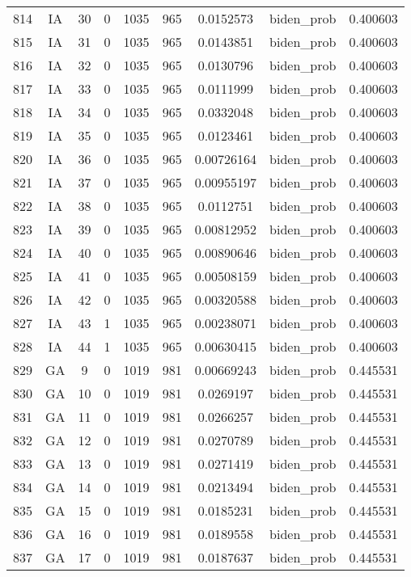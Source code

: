 \documentclass[12pt,a4paper]{article}
\begin{document}
\begin{tabular}{r|cccccccc}
	814 & IA & 30 & 0 & 1035 & 965 & 0.0152573 & biden\_prob & 0.400603 \\
	815 & IA & 31 & 0 & 1035 & 965 & 0.0143851 & biden\_prob & 0.400603 \\
	816 & IA & 32 & 0 & 1035 & 965 & 0.0130796 & biden\_prob & 0.400603 \\
	817 & IA & 33 & 0 & 1035 & 965 & 0.0111999 & biden\_prob & 0.400603 \\
	818 & IA & 34 & 0 & 1035 & 965 & 0.0332048 & biden\_prob & 0.400603 \\
	819 & IA & 35 & 0 & 1035 & 965 & 0.0123461 & biden\_prob & 0.400603 \\
	820 & IA & 36 & 0 & 1035 & 965 & 0.00726164 & biden\_prob & 0.400603 \\
	821 & IA & 37 & 0 & 1035 & 965 & 0.00955197 & biden\_prob & 0.400603 \\
	822 & IA & 38 & 0 & 1035 & 965 & 0.0112751 & biden\_prob & 0.400603 \\
	823 & IA & 39 & 0 & 1035 & 965 & 0.00812952 & biden\_prob & 0.400603 \\
	824 & IA & 40 & 0 & 1035 & 965 & 0.00890646 & biden\_prob & 0.400603 \\
	825 & IA & 41 & 0 & 1035 & 965 & 0.00508159 & biden\_prob & 0.400603 \\
	826 & IA & 42 & 0 & 1035 & 965 & 0.00320588 & biden\_prob & 0.400603 \\
	827 & IA & 43 & 1 & 1035 & 965 & 0.00238071 & biden\_prob & 0.400603 \\
	828 & IA & 44 & 1 & 1035 & 965 & 0.00630415 & biden\_prob & 0.400603 \\
	829 & GA & 9 & 0 & 1019 & 981 & 0.00669243 & biden\_prob & 0.445531 \\
	830 & GA & 10 & 0 & 1019 & 981 & 0.0269197 & biden\_prob & 0.445531 \\
	831 & GA & 11 & 0 & 1019 & 981 & 0.0266257 & biden\_prob & 0.445531 \\
	832 & GA & 12 & 0 & 1019 & 981 & 0.0270789 & biden\_prob & 0.445531 \\
	833 & GA & 13 & 0 & 1019 & 981 & 0.0271419 & biden\_prob & 0.445531 \\
	834 & GA & 14 & 0 & 1019 & 981 & 0.0213494 & biden\_prob & 0.445531 \\
	835 & GA & 15 & 0 & 1019 & 981 & 0.0185231 & biden\_prob & 0.445531 \\
	836 & GA & 16 & 0 & 1019 & 981 & 0.0189558 & biden\_prob & 0.445531 \\
	837 & GA & 17 & 0 & 1019 & 981 & 0.0187637 & biden\_prob & 0.445531 \\

\end{tabular}
\end{document}
